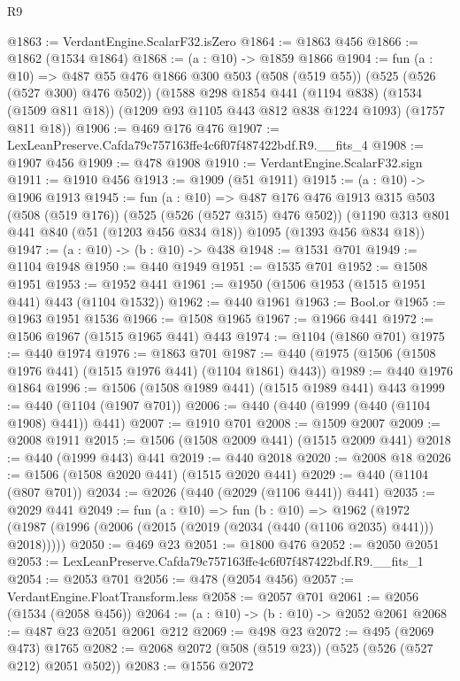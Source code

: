 \begin{lexlean}{R9}
\begin{coremodule}
@1863 := VerdantEngine.ScalarF32.isZero
@1864 := @1863 @456
@1866 := @1862 (@1534 @1864)
@1868 := (a : @10) -> @1859 @1866
@1904 := fun (a : @10) =>
  @487
    @55
    @476
    @1866
    @300
    @503
    (@508 (@519 @55))
    (@525 (@526 (@527 @300) @476 @502))
    (@1588
      @298
      @1854
      @441
      (@1194 @838)
      (@1534 (@1509 @811 @18))
      (@1209 @93 @1105 @443 @812 @838 @1224 @1093)
      (@1757 @811 @18))
@1906 := @469 @176 @476
@1907 := LexLeanPreserve.Cafda79c757163ffe4c6f07f487422bdf.R9.__fits_4
@1908 := @1907 @456
@1909 := @478 @1908
@1910 := VerdantEngine.ScalarF32.sign
@1911 := @1910 @456
@1913 := @1909 (@51 @1911)
@1915 := (a : @10) -> @1906 @1913
@1945 := fun (a : @10) =>
  @487
    @176
    @476
    @1913
    @315
    @503
    (@508 (@519 @176))
    (@525 (@526 (@527 @315) @476 @502))
    (@1190 @313 @801 @441 @840 (@51 (@1203 @456 @834 @18)) @1095 (@1393 @456 @834 @18))
@1947 := (a : @10) -> (b : @10) -> @438
@1948 := @1531 @701
@1949 := @1104 @1948
@1950 := @440 @1949
@1951 := @1535 @701
@1952 := @1508 @1951
@1953 := @1952 @441
@1961 := @1950 (@1506 @1953 (@1515 @1951 @441) @443 (@1104 @1532))
@1962 := @440 @1961
@1963 := Bool.or
@1965 := @1963 @1951 @1536
@1966 := @1508 @1965
@1967 := @1966 @441
@1972 := @1506 @1967 (@1515 @1965 @441) @443
@1974 := @1104 (@1860 @701)
@1975 := @440 @1974
@1976 := @1863 @701
@1987 := @440 (@1975 (@1506 (@1508 @1976 @441) (@1515 @1976 @441) (@1104 @1861) @443))
@1989 := @440 @1976 @1864
@1996 := @1506 (@1508 @1989 @441) (@1515 @1989 @441) @443
@1999 := @440 (@1104 (@1907 @701))
@2006 := @440 (@440 (@1999 (@440 (@1104 @1908) @441)) @441)
@2007 := @1910 @701
@2008 := @1509 @2007
@2009 := @2008 @1911
@2015 := @1506 (@1508 @2009 @441) (@1515 @2009 @441)
@2018 := @440 (@1999 @443) @441
@2019 := @440 @2018
@2020 := @2008 @18
@2026 := @1506 (@1508 @2020 @441) (@1515 @2020 @441)
@2029 := @440 (@1104 (@807 @701))
@2034 := @2026 (@440 (@2029 (@1106 @441)) @441)
@2035 := @2029 @441
@2049 := fun (a : @10) =>
  fun (b : @10) =>
  @1962 (@1972 (@1987 (@1996 (@2006 (@2015 (@2019 (@2034 (@440 (@1106 @2035) @441))) @2018)))))
@2050 := @469 @23
@2051 := @1800 @476
@2052 := @2050 @2051
@2053 := LexLeanPreserve.Cafda79c757163ffe4c6f07f487422bdf.R9.__fits_1
@2054 := @2053 @701
@2056 := @478 (@2054 @456)
@2057 := VerdantEngine.FloatTransform.less
@2058 := @2057 @701
@2061 := @2056 (@1534 (@2058 @456))
@2064 := (a : @10) -> (b : @10) -> @2052 @2061
@2068 := @487 @23 @2051 @2061 @212
@2069 := @498 @23
@2072 := @495 (@2069 @473) @1765
@2082 := @2068 @2072 (@508 (@519 @23)) (@525 (@526 (@527 @212) @2051 @502))
@2083 := @1556 @2072

\end{coremodule}
\end{lexlean}
